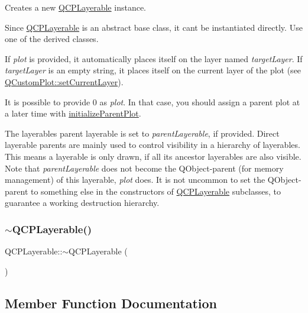 Creates a new \hyperlink{class_q_c_p_layerable}{Q\+C\+P\+Layerable} instance.

Since \hyperlink{class_q_c_p_layerable}{Q\+C\+P\+Layerable} is an abstract base class, it can\textquotesingle{}t be instantiated directly. Use one of the derived classes.

If {\itshape plot} is provided, it automatically places itself on the layer named {\itshape target\+Layer}. If {\itshape target\+Layer} is an empty string, it places itself on the current layer of the plot (see \hyperlink{class_q_custom_plot_a73a6dc47c653bb6f8f030abca5a11852}{Q\+Custom\+Plot\+::set\+Current\+Layer}).

It is possible to provide 0 as {\itshape plot}. In that case, you should assign a parent plot at a later time with \hyperlink{class_q_c_p_layerable_a8cbe5a0c9a5674249982f5ca5f8e02bc}{initialize\+Parent\+Plot}.

The layerable\textquotesingle{}s parent layerable is set to {\itshape parent\+Layerable}, if provided. Direct layerable parents are mainly used to control visibility in a hierarchy of layerables. This means a layerable is only drawn, if all its ancestor layerables are also visible. Note that {\itshape parent\+Layerable} does not become the Q\+Object-\/parent (for memory management) of this layerable, {\itshape plot} does. It is not uncommon to set the Q\+Object-\/parent to something else in the constructors of \hyperlink{class_q_c_p_layerable}{Q\+C\+P\+Layerable} subclasses, to guarantee a working destruction hierarchy. \mbox{\label{class_q_c_p_layerable_a4231cf5b3601d6d3a5781283e7a9735b}} 
\subsubsection{\texorpdfstring{$\sim$\+Q\+C\+P\+Layerable()}{~QCPLayerable()}}
{\footnotesize\ttfamily Q\+C\+P\+Layerable\+::$\sim$\+Q\+C\+P\+Layerable (\begin{DoxyParamCaption}{ }\end{DoxyParamCaption})\hspace{0.3cm}{\ttfamily [virtual]}}



\subsection{Member Function Documentation}
\mbox{\label{class_q_c_p_layerable_a71cbd212fde2703cee076e204a475709}} 
